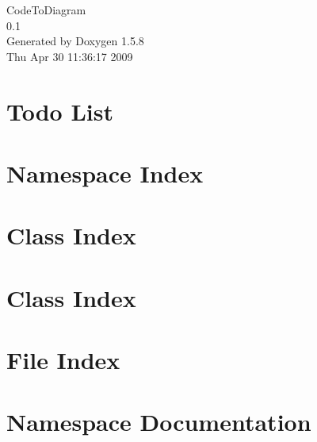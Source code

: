 \documentclass[a4paper]{book}
\begin{document}
\begin{titlepage}
\vspace*{7cm}
\begin{center}
{\Large CodeToDiagram \\[1ex]\large 0.1 }\\
\vspace*{1cm}
{\large Generated by Doxygen 1.5.8}\\
\vspace*{0.5cm}
{\small Thu Apr 30 11:36:17 2009}\\
\end{center}
\end{titlepage}
\clearemptydoublepage
{}
\tableofcontents
\clearemptydoublepage
{}
\chapter{Todo List}
\label{todo}
\hypertarget{todo}{}

\chapter{Namespace Index}

\chapter{Class Index}

\chapter{Class Index}

\chapter{File Index}

\chapter{Namespace Documentation}








\end{document}
